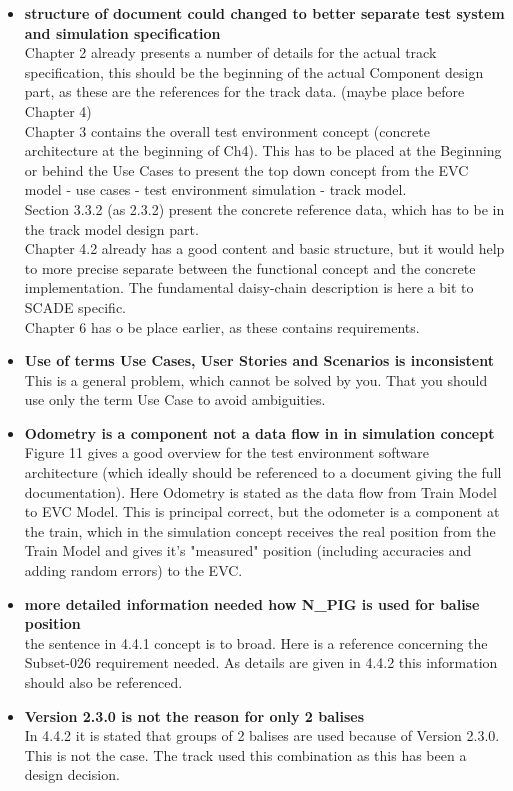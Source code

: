 \documentclass{article}
\begin{document}
\begin{itemize}
\item \textbf{structure of document could changed to better separate test system and simulation specification}\\
Chapter 2 already presents a number of details for the actual track specification, this should be the beginning of the actual Component design part, as these are the references for the track data. (maybe place before Chapter 4) \\
Chapter 3 contains the overall test environment concept (concrete architecture at the beginning of Ch4). 
This has to be placed at the Beginning or behind the Use Cases to present the top down concept from the EVC model - use cases - test environment simulation - track model.\\
Section 3.3.2 (as 2.3.2) present the concrete reference data, which has to be in the track model design part.\\
Chapter 4.2 already has a good content and basic structure, but it would help to more precise separate between the functional concept and the concrete implementation. The fundamental daisy-chain description is here a bit to SCADE specific.\\
Chapter 6 has o be place earlier, as these contains requirements.
\item \textbf{Use of terms Use Cases, User Stories and Scenarios is inconsistent}\\
This is a general problem, which cannot be solved by you. That you should use only the term Use Case to avoid ambiguities.
\item \textbf{Odometry is a component not a data flow in in simulation concept}\\
Figure 11 gives a good overview for the test environment software architecture (which ideally should be referenced to a document giving the full documentation). Here Odometry is stated as the data flow from Train Model to EVC Model. This is principal correct, but the odometer is a component at the train, which in the simulation concept receives the real position from the Train Model and gives it's "measured" position (including accuracies and adding random errors) to the EVC.
\item \textbf{more detailed information needed how N\_PIG is used for balise position}\\
the sentence in 4.4.1 concept is to broad. Here is a reference concerning the Subset-026 requirement needed. As details are given in 4.4.2 this information should also be referenced.
\item \textbf{Version 2.3.0 is not the reason for only 2 balises}\\
In 4.4.2 it is stated that groups of 2 balises are used because of Version 2.3.0. This is not the case. The track used this combination as this has been a design decision.
\end{itemize}
\end{document}
